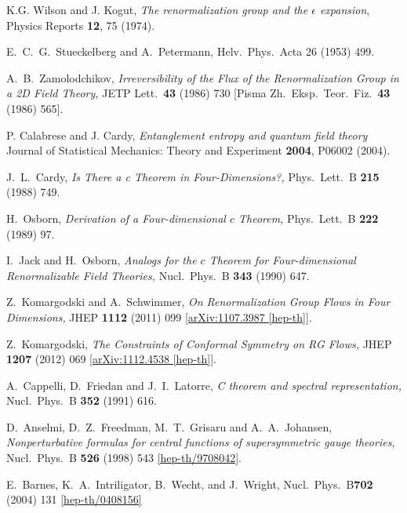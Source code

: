 \documentclass[12pt,a4paper]{article}
\numberwithin{equation}{section}
\begin{document}
\begin{thebibliography}{99}

K.G. Wilson and J. Kogut,
\textit{The renormalization group and the $\epsilon$ expansion},
Physics Reports {\bf 12}, 75 (1974).

E.~C.~G.~Stueckelberg and A.~Petermann,
Helv.~Phys.~Acta 26 (1953) 499.

A.~B.~Zamolodchikov,
\textit{Irreversibility of the Flux of the Renormalization Group in a 2D Field Theory,}
JETP Lett.\  {\bf 43} (1986) 730
[Pisma Zh.\ Eksp.\ Teor.\ Fiz.\  {\bf 43} (1986) 565].

P. Calabrese and J. Cardy,
\textit{Entanglement entropy and quantum field theory}
Journal of Statistical Mechanics: Theory and Experiment {\bf 2004}, P06002 (2004).

J.~L.~Cardy,
\textit{Is There a c Theorem in Four-Dimensions?,}
Phys.\ Lett.\ B {\bf 215} (1988) 749.

H.~Osborn,
\textit{Derivation of a Four-dimensional $c$ Theorem,}
Phys.\ Lett.\ B {\bf 222} (1989) 97.

I.~Jack and H.~Osborn,
\textit{Analogs for the $c$ Theorem for Four-dimensional Renormalizable Field Theories,}
Nucl.\ Phys.\ B {\bf 343} (1990) 647.

Z.~Komargodski and A.~Schwimmer,
\textit{On Renormalization Group Flows in Four Dimensions,}
JHEP {\bf 1112} (2011) 099
\href{http://arxiv.org/abs/1107.3987}{[arXiv:1107.3987 [hep-th]]}.

Z.~Komargodski,
\textit{The Constraints of Conformal Symmetry on RG Flows,}
JHEP {\bf 1207} (2012) 069
\href{http://arxiv.org/abs/1112.4538}{[arXiv:1112.4538 [hep-th]]}.

A.~Cappelli, D.~Friedan and J.~I.~Latorre,
\textit{C theorem and spectral representation,}
Nucl.\ Phys.\ B {\bf 352} (1991) 616.

D.~Anselmi, D.~Z.~Freedman, M.~T.~Grisaru and A.~A.~Johansen,
\textit{Nonperturbative formulas for central functions of supersymmetric gauge theories,}
Nucl.\ Phys.\ B {\bf 526} (1998) 543
\href{http://arxiv.org/pdf/hep-th/9708042.pdf}{[hep-th/9708042]}.

E.~Barnes, K.~A.~Intriligator, B.~Wecht, and J.~Wright,
Nucl.\ Phys.\ B{\bf 702} (2004) 131
\href{http://arxiv.org/pdf/hep-th/0408156v2}{[hep-th/0408156]}


\end{thebibliography}
\end{document}
